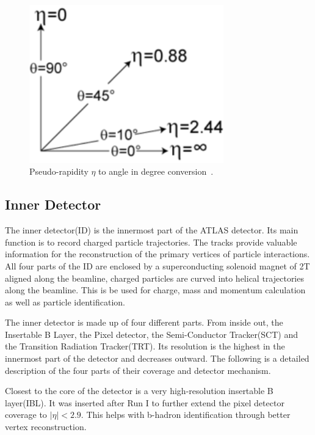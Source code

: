 \begin{figure}[!htb]
    \begin{center}
        \includegraphics[width=0.75\textwidth]{figures/chapter_ATLAS/pseudorapidity}
        \caption{
            Pseudo-rapidity $\eta$ to angle in degree conversion~\cite{enwiki:1052183914}.
        }
        \label{fig:pseudorapidity}
    \end{center}
\end{figure}



\subsection{Inner Detector}
The inner detector(ID) is the innermost part of the ATLAS detector. Its main function is to record charged particle trajectories. The tracks provide valuable information for the reconstruction of the primary vertices of particle interactions. All four parts of the ID are enclosed by a superconducting solenoid magnet of 2T aligned along the beamline, charged particles are curved into helical trajectories along the beamline. This is be used for charge, mass and momentum calculation as well as particle
identification. 



The inner detector is made up of four different parts. From inside out, the Insertable B Layer, the Pixel detector, the Semi-Conductor Tracker(SCT) and the Transition Radiation Tracker(TRT). 
Its resolution is the highest in the innermost part of the detector and decreases outward. The following is a detailed description of the four parts of their coverage and detector mechanism. 

Closest to the core of the detector is a very high-resolution insertable B layer(IBL). It was inserted after Run I to further extend the pixel detector coverage to $|\eta|< 2.9$. This helps with b-hadron identification through better vertex reconstruction.

